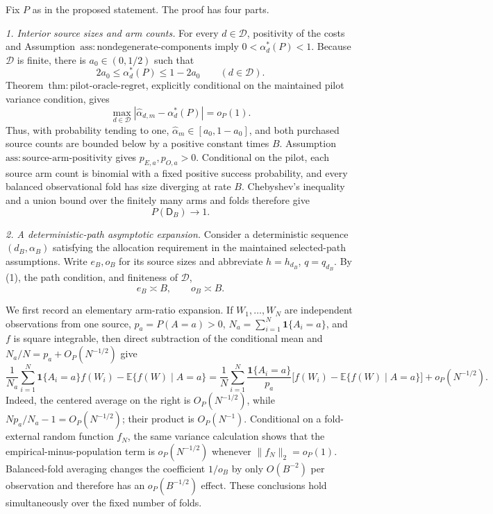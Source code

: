 Fix \(P\) as in the proposed statement.  The proof has four parts.

\emph{1. Interior source sizes and arm counts.}
For every \(d\in\mathcal D\), positivity of the costs and Assumption~\(\mathrm{ass{:}nondegenerate\text{-}components}\) imply \(0<\alpha_d^*(P)<1\).  Because \(\mathcal D\) is finite, there is \(a_0\in(0,1/2)\) such that
\[
 2a_0\le \alpha_d^*(P)\le1-2a_0
 \qquad(d\in\mathcal D).                                 \tag{1}
\]
Theorem~\(\mathrm{thm{:}pilot\text{-}oracle\text{-}regret}\), explicitly conditional on the maintained pilot variance condition, gives
\[
 \max_{d\in\mathcal D}
 |\widehat\alpha_{d,m}-\alpha_d^*(P)|=o_P(1).             \tag{2}
\]
Thus, with probability tending to one, \(\widehat\alpha_m\in[a_0,1-a_0]\), and both purchased source counts are bounded below by a positive constant times \(B\).  Assumption~\(\mathrm{ass{:}source\text{-}arm\text{-}positivity}\) gives \(p_{E,a},p_{O,a}>0\).  Conditional on the pilot, each source arm count is binomial with a fixed positive success probability, and every balanced observational fold has size diverging at rate \(B\).  Chebyshev's inequality and a union bound over the finitely many arms and folds therefore give
\[
 P(\mathsf D_B)\longrightarrow1.                          \tag{3}
\]

\emph{2. A deterministic-path asymptotic expansion.}
Consider a deterministic sequence \((d_B,\alpha_B)\) satisfying the allocation requirement in the maintained selected-path assumptions.  Write \(e_B,o_B\) for its source sizes and abbreviate \(h=h_{d_B}\), \(q=q_{d_B}\).  By (1), the path condition, and finiteness of \(\mathcal D\),
\[
 e_B\asymp B,
 \qquad
 o_B\asymp B.                                             \tag{4}
\]

We first record an elementary arm-ratio expansion.  If \(W_1,\ldots,W_N\) are independent observations from one source, \(p_a=P(A=a)>0\), \(N_a=\sum_{i=1}^N\mathbf1\{A_i=a\}\), and \(f\) is square integrable, then direct subtraction of the conditional mean and \(N_a/N=p_a+O_P(N^{-1/2})\) give
\[
 \frac{1}{N_a}\sum_{i=1}^N\mathbf1\{A_i=a\}f(W_i)
 -\mathbb E\{f(W)\mid A=a\}
 =\frac1N\sum_{i=1}^N\frac{\mathbf1\{A_i=a\}}{p_a}
 \bigl[f(W_i)-\mathbb E\{f(W)\mid A=a\}\bigr]
 +o_P(N^{-1/2}).                                          \tag{5}
\]
Indeed, the centered average on the right is \(O_P(N^{-1/2})\), while \(Np_a/N_a-1=O_P(N^{-1/2})\); their product is \(O_P(N^{-1})\).  Conditional on a fold-external random function \(f_N\), the same variance calculation shows that the empirical-minus-population term is \(o_P(N^{-1/2})\) whenever \(\|f_N\|_2=o_P(1)\).  Balanced-fold averaging changes the coefficient \(1/o_B\) by only \(O(B^{-2})\) per observation and therefore has an \(o_P(B^{-1/2})\) effect.  These conclusions hold simultaneously over the fixed number of folds.

